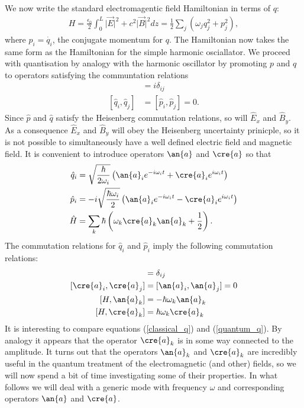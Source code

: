 We now write the standard electromagentic field Hamiltonian in terms of $q$:
\begin{align}
  H = \frac{\epsilon_0}{2} \int_0^L \vert \vec{E}\vert^2 + c^2\vert\vec{B}\vert^2 dz 
  = \frac{1}{2} \sum_j \left(\omega_j q_j^2 + p_j^2\right),
\end{align}
where $p_i = \dot{q_i}$, the conjugate momentum for $q$. The Hamiltonian now takes the same form as the Hamiltonian for the simple harmonic osciallator. We proceed with quantisation by analogy with the harmonic oscillator by promoting $p$ and $q$ to operators satisfying the communtation relations
\begin{align}
  [\hat{q}_i, \hat{p}_j] &= i\delta_{ij} \\
  [\hat{q}_i, \hat{q}_j] &= [\hat{p}_i, \hat{p}_j] = 0.
\end{align}
Since $\hat{p}$ and $\hat{q}$ satisfy the Heisenberg commutation relations, so will $\hat{E}_x$ and $\hat{B}_y$. As a consequence $\hat{E}_x$ and $\hat{B}_y$ will obey the Heisenberg uncertainty prinicple, so it is not possible to simultaneously have a well defined electric field and magnetic field. It is convenient to introduce operators $\an{a}$ and $\cre{a}$ so that
\begin{align}
  \hat{q}_i &= \sqrt{\frac{\hbar}{2\omega_i}}\left( \an{a}_ie^{-i\omega_i t} + \cre{a}_ie^{i\omega_i t}\right)\label{quantum_q} \\
  \hat{p}_i &= -i \sqrt{\frac{\hbar\omega_i}{2}}\left( \an{a}_ie^{-i\omega_i t} - \cre{a}_ie^{i\omega_i t}\right)\\
  \hat{H} &= \sum_k \hbar \left( \omega_k \cre{a}_k\an{a}_k +\frac{1}{2} \right).
\end{align}
The commutation relations for $\hat{q}_i$ and $\hat{p}_i$ imply the following commutation relations:
\begin{align}
  [\cre{a}_i, \an{a}_j] &= \delta_{ij} \\
  [\cre{a}_i, \cre{a}_j] &= [\an{a}_i, \an{a}_j] = 0 \\
  \left[H, \an{a}_k\right] &= -\hbar \omega_k \an{a}_k\\
  \left[H, \cre{a}_k\right] &= \hbar \omega_k \cre{a}_k
\end{align}
It is interesting to compare equations (\ref{classical_q}) and (\ref{quantum_q}). By analogy it appears that the operator $\cre{a}_k$ is in some way connected to the amplitude. It turns out that the operators $\an{a}_k$ and $\cre{a}_k$ are incredibly useful in the quantum treatment of the electromagnetic (and other) fields, so we will now spend a bit of time investigating some of their properties. In what follows we will deal with a generic mode with frequency $\omega$ and corresponding operators $\an{a}$ and $\cre{a}$.

